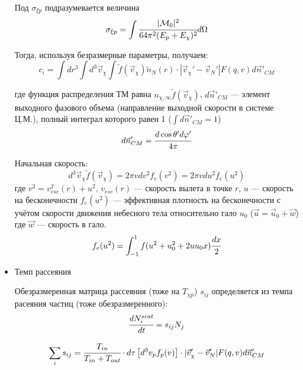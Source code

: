 \begin{itemize}
		Под $\sigma_{\xi p}$ подразумевается величина
		\begin{equation*}
			\sigma_{\xi p} = \int{\cfrac{ |\mathcal{M}_0|^2  }{64\pi^2 (E_p+E_{\chi})^2} d\Omega}
		\end{equation*}
		
		Тогда, используя безразмерные параметры, получаем:
		\begin{equation*}
			c_i = \int{ dr^3 \int{d^3\vec{v}_{\chi}\int{ \widetilde{f}(\vec{v}_{\chi}) 
				\widetilde{n}_N(r)  \cdot |\vec{v}_{\chi}'-\vec{v}_{N}'| F(q,v) d\vec{n}'_{CM} }}} 
		\end{equation*}
		
		где функция распределения ТМ равна $n_{\chi,\infty} \widetilde{f}(\vec{v}_{\chi})$, $d\vec{n}'_{CM}$ --- элемент выходного фазового объема (направление выходной скорости в системе Ц.М.), полный интеграл которого равен 1 ($\int {d\vec{n}'_{CM} } = 1$)
		\begin{equation*}
			d\vec{n}'_{CM} = \cfrac{d\cos{\theta'} d \varphi' }{4\pi}
		\end{equation*}
		
		Начальная скорость: 
		\begin{equation*}
			d^3\vec{v}_{\chi} \widetilde{f}(\vec{v}_{\chi}) = 2\pi v dv^2 f_e(v^2) = 2\pi v du^2 f_e(u^2)  
		\end{equation*}
		где $v^2 = v^2_{esc}(r) + u^2$, $v_{esc}(r)$ --- скорость вылета в точке $r$, $u$ --- скорость на бесконечности $f_e(u^2)$ --- эффективная плотность на бесконечности с учётом скорости движения небесного тела относительно гало $u_0$ ($\vec{u} = \vec{u}_0 + \vec{w}$) где $\vec{w}$ --- скорость в гало. 
		\begin{equation*}
			f_e(u^2) = \int_{-1}^1 {f(u^2+u^2_0 + 2 u u_0 x) \cfrac{dx}{2}}
		\end{equation*}
		
		\item Темп рассеяния
		
		Обезразмеренная матрица рассеяния (тоже на $T_{\chi p}$) $s_{ij}$ определяется из 
		темпа расеяния частиц (тоже обезразмеренного):
		\begin{equation*}
		\cfrac{d N_{i}^{scat}}{dt} = s_{ij} N_j
		\end{equation*}
		
		\begin{equation*}
			\sum_i{s_{ij}} = 
			\cfrac{T_{in}}{T_{in}+T_{out}} \cdot d\tau \left[ d^3v_p f_p(v) \right] \cdot |\vec{v}_{\chi}'-\vec{v}_{N}'| F(q,v) d\vec{n}'_{CM}
		\end{equation*}
		

\end{itemize}
